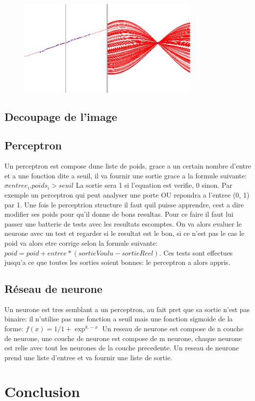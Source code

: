 \documentclass{article}
\begin{document}
\begin{figure}[hp]
\centering
\includegraphics[width=0.80\textwidth]{img/hough.png}
\end{figure}
\subsection{Decoupage de l'image}
\subsection{Perceptron}
Un perceptron est compose dune liste de poids, grace a un certain nombre d'entre et a une fonction dite a seuil, il va fournir une sortie grace a la formule suivante: 
$\sigma entree_{i}.poids_{i} > seuil$
 La sortie sera 1 si l'equation est verifie, 0 sinon. Par exemple un perceptron qui peut analyser une porte OU repondra a l'entree (0, 1) par 1.
Une fois le perceptrion structure il faut quil puisse apprendre, cest a dire modifier ses poids pour qu'il donne de bons resultas. Pour ce faire il faut lui passer une batterie de tests avec les resultats escomptes. On va alors evaluer le neurone avec un test et regarder si le resultat est le bon, si ce n'est pas le cas le poid va alors etre corrige selon la formule suivante: 
$poid = poid + entree*(sortieVoulu - sortieReel)$.
 Ces tests sont effectues jusqu'a ce que toutes les sorties soient bonnes: le perceptron a alors appris.


\subsection{Réseau de neurone}
Un neurone est tres semblant a un perceptron, au fait pret que sa sortie n'est pas binaire: il n'utilise pas une fonction a seuil mais une fonction sigmoide de la forme: 
$f(x) = 1 / 1 + \exp ^{k.-x}$
Un reseau de neurone est compose de n couche de neurone, une couche de neurone est compose de m neurone, chaque neurone est relie avec tout les neurones de la couche precedente. Un reseau de neurone prend une liste d'entree et va fournir une liste de sortie.

\section{Conclusion}
\end{document}
